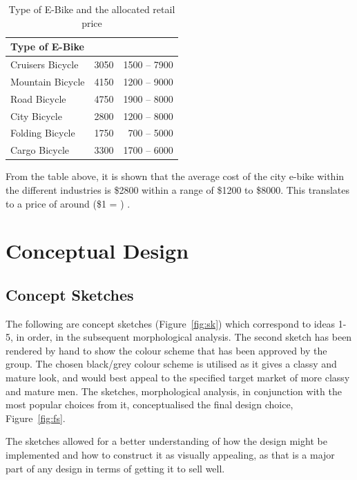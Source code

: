 \documentclass[a4paper,11pt]{article}
\begin{document}
\begin{table}[!ht]
	\centering
	\caption{Type of E-Bike and the allocated retail price}
	\begin{tabular}{l r r}
		\hline
		Type of E-Bike&\makecell[l]{Average Cost (\$)}&\makecell[l]{Range (\$)}\\ \hline
		Cruisers Bicycle	&3050	&1500 -- 7900\\
		Mountain Bicycle	&4150	&1200 -- 9000\\
		Road Bicycle	&4750	&1900 -- 8000\\
		City Bicycle	&2800	&1200 -- 8000\\
		Folding Bicycle	&1750	&700 -- 5000\\
		Cargo Bicycle	&3300	&1700 -- 6000\\
	\end{tabular}
\end{table}

From the table above, it is shown that the average cost of the city e-bike within the different industries is \$2800 within a range of \$1200 to \$8000. This translates to a price of around  (\$1 = ) \cite{xe}. 

\section{Conceptual Design}

\subsection{Concept Sketches}

The following are concept sketches (Figure~\ref{fig:sk}) which correspond to ideas 1-5, in order, in the subsequent morphological analysis. The second sketch has been rendered by hand to show the colour scheme that has been approved by the group. The chosen black/grey colour scheme is utilised as it gives a classy and mature look, and would best appeal to the specified target market of more classy and mature men. The sketches, morphological analysis, in conjunction with the most popular choices from it, conceptualised the final design choice, Figure~\ref{fig:fs}. 

The sketches allowed for a better understanding of how the design might be implemented and how to construct it as visually appealing, as that is a major part of any design in terms of getting it to sell well. 
\end{document}
